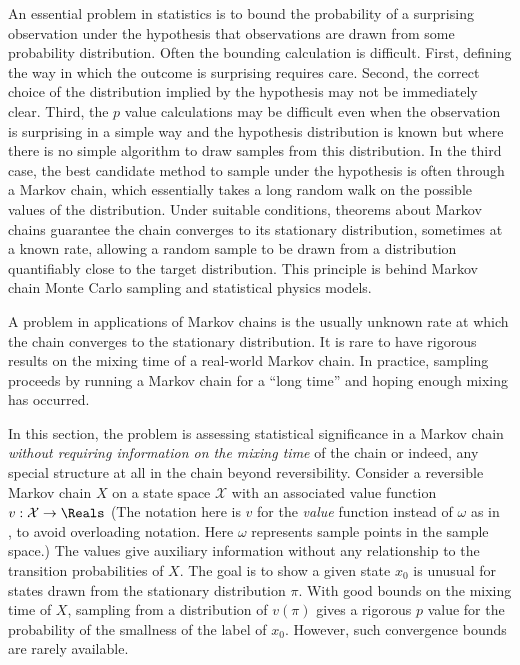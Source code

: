 \documentclass[12pt]{article}
\begin{document}
An essential problem in statistics is to bound the probability of a
surprising observation under the hypothesis that observations are drawn
from some probability distribution.  Often the bounding calculation is
difficult.  First, defining the way in which the outcome is surprising
requires care.  Second, the correct choice of the distribution implied
by the hypothesis may not be immediately clear.  Third, the \( p \)
value calculations may be difficult even when the observation is
surprising in a simple way and the hypothesis distribution is known but
where there is no simple algorithm to draw samples from this
distribution.  In the third case, the best candidate method to sample
under the hypothesis is often through a Markov chain, which essentially
takes a long random walk on the possible values of the distribution.
Under suitable conditions, theorems about Markov chains guarantee the
chain converges to its stationary distribution, sometimes at a known
rate, allowing a random sample to be drawn from a distribution
quantifiably close to the target distribution.  This principle is behind
Markov chain Monte Carlo sampling and statistical physics models.

A problem in applications of Markov chains is the usually unknown rate
at which the chain converges to the stationary distribution.  It is rare
to have rigorous results on the mixing time of a real-world Markov
chain.  In practice, sampling proceeds by running a Markov chain for a
``long time'' and hoping enough mixing has occurred.

In this section, the problem is assessing statistical significance in a
Markov chain \emph{without requiring information on the mixing time} of
the chain or indeed, any special structure at all in the chain beyond
reversibility.  Consider a reversible Markov chain \( X \) on a state
space \( \mathcal{X} \) with an associated value function \( v :
\mathcal{X} \to \Reals \) (The notation here is \( v \) for the \emph{value}
function instead of \( \omega \) as in~%
\cite{Chikina2860}, to avoid overloading notation.  Here \( \omega \)
represents sample points in the sample space.) The values give auxiliary
information without any relationship to the transition probabilities of \(
X \).  The goal is to show a given state \( x_0 \) is unusual for states
drawn from the stationary distribution \( \pi \).  With good bounds on
the mixing time of \( X \), sampling from a distribution of \( v(\pi) \)
gives a rigorous \( p \) value for the probability of the smallness of
the label of \( x_0 \).  However, such convergence bounds are rarely
available.
\end{document}
